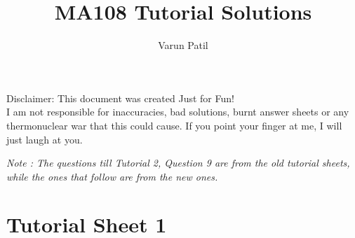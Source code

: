 \documentclass[a4paper]{article}
\title{MA108 Tutorial Solutions}
\author{Varun Patil}
\begin{document}
\maketitle 
\vspace{-8mm}
\begin{center}Disclaimer: This document was created Just for Fun!
\\I am not responsible for inaccuracies, bad solutions, burnt answer sheets or any thermonuclear war that this could cause. If you point your finger at me, I will just laugh at you.\end{center}

\textit{Note : The questions till Tutorial 2, Question 9 are from the old tutorial sheets, while the ones that follow are from the new ones.}

\section{Tutorial Sheet 1}
\renewcommand{\labelenumii}{(\roman{enumii})}
\end{document}

